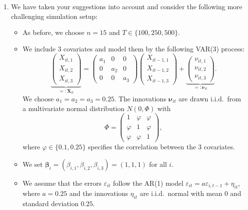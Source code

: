 \documentclass[a4paper,12pt]{article}
\begin{document}
\begin{enumerate}[label=\arabic*.,leftmargin=0.6cm]
\begin{enumerate}[label=(\roman*),leftmargin=0.75cm,topsep=0pt]
\item We have taken your suggestions into account and consider the following more challenging simulation setup:

\begin{itemize}[leftmargin=0.45cm,itemsep=0pt,topsep=0pt]

\item As before, we choose $n=15$ and $T \in \{100,250,500\}$. 
  
\item We include $3$ covariates and model them by the following VAR(3) process:
\[ \underbrace{\begin{pmatrix} X_{it,1} \\ X_{it,2} \\ X_{it,3} \end{pmatrix}}_{=: \boldsymbol{X}_{it}} = \begin{pmatrix} a_1 & 0 & 0 \\ 0 & a_2 & 0 \\ 0 & 0 & a_3 \end{pmatrix} \begin{pmatrix} X_{it-1,1} \\ X_{it-1,2} \\ X_{it-1,3} \end{pmatrix} + \underbrace{\begin{pmatrix} \nu_{it,1} \\ \nu_{it,2} \\ \nu_{it,3} \end{pmatrix}}_{=: \boldsymbol{\nu}_{it}}. \] 
We choose $a_1 = a_2 = a_3 = 0.25$. The innovations $\boldsymbol{\nu}_{it}$ are drawn i.i.d.\ from a multivariate normal distribution $N(0,\Phi)$ with
\[ \Phi = \begin{pmatrix} 1 & \varphi & \varphi \\ \varphi & 1 & \varphi \\ \varphi & \varphi & 1 \end{pmatrix}, \]
where $\varphi \in \{0.1, 0.25\}$ specifies the correlation between the 3 covariates. 

\item We set $\boldsymbol{\beta}_i = (\beta_{i,1},\beta_{i,2},\beta_{i,3}) = (1,1,1)$ for all $i$.

\item We assume that the errors $\varepsilon_{it}$ follow the AR(1) model $\varepsilon_{it} = a \varepsilon_{i,t-1} + \eta_{it}$, where $a=0.25$ and the innovations $\eta_{it}$ are i.i.d.\ normal with mean $0$ and standard deviation $0.25$.


\end{itemize}
\end{enumerate}
\end{enumerate}
\end{document}

